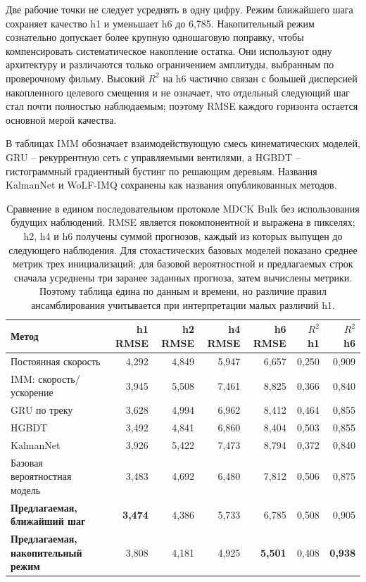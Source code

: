\documentclass[11pt,a4paper]{article}
\begin{document}
Две рабочие точки не следует усреднять в одну цифру. Режим ближайшего шага сохраняет качество h1 и уменьшает h6 до 6,785. Накопительный режим сознательно допускает более крупную одношаговую поправку, чтобы компенсировать систематическое накопление остатка. Они используют одну архитектуру и различаются только ограничением амплитуды, выбранным по проверочному фильму. Высокий $R^2$ на h6 частично связан с большей дисперсией накопленного целевого смещения и не означает, что отдельный следующий шаг стал почти полностью наблюдаемым; поэтому RMSE каждого горизонта остается основной мерой качества.

В таблицах IMM обозначает взаимодействующую смесь кинематических моделей, GRU -- рекуррентную сеть с управляемыми вентилями, а HGBDT -- гистограммный градиентный бустинг по решающим деревьям. Названия KalmanNet и WoLF-IMQ сохранены как названия опубликованных методов.


\begin{table}[tb]
\centering
\caption{Сравнение в едином последовательном протоколе MDCK Bulk без использования будущих наблюдений. RMSE является покомпонентной и выражена в пикселях; h2, h4 и h6 получены суммой прогнозов, каждый из которых выпущен до следующего наблюдения. Для стохастических базовых моделей показано среднее метрик трех инициализаций; для базовой вероятностной и предлагаемых строк сначала усреднены три заранее заданных прогноза, затем вычислены метрики. Поэтому таблица едина по данным и времени, но различие правил ансамблирования учитывается при интерпретации малых различий h1.}
\label{tab:benchmark}
\small
\setlength{\tabcolsep}{4.5pt}
\begin{tabularx}{\textwidth}{@{}Y r r r r r r@{}}
\toprule
Метод & {h1 RMSE} & {h2 RMSE} & {h4 RMSE} & {h6 RMSE} & {$R^2$ h1} & {$R^2$ h6} \\
\midrule
Постоянная скорость & 4{,}292 & 4{,}849 & 5{,}947 & 6{,}657 & 0{,}250 & 0{,}909 \\
IMM: скорость/ускорение & 3{,}945 & 5{,}508 & 7{,}461 & 8{,}825 & 0{,}366 & 0{,}840 \\
GRU по треку & 3{,}628 & 4{,}994 & 6{,}962 & 8{,}412 & 0{,}464 & 0{,}855 \\
HGBDT & 3{,}492 & 4{,}841 & 6{,}860 & 8{,}404 & 0{,}503 & 0{,}855 \\
KalmanNet & 3{,}926 & 5{,}422 & 7{,}473 & 8{,}794 & 0{,}372 & 0{,}840 \\
Базовая вероятностная модель & 3{,}483 & 4{,}692 & 6{,}480 & 7{,}812 & 0{,}506 & 0{,}875 \\
\textbf{Предлагаемая, ближайший шаг} & \textbf{3{,}474} & 4{,}386 & 5{,}733 & 6{,}785 & 0{,}508 & 0{,}905 \\
\textbf{Предлагаемая, накопительный режим} & 3{,}808 & 4{,}181 & 4{,}925 & \textbf{5{,}501} & 0{,}408 & \textbf{0{,}938} \\
\bottomrule
\end{tabularx}
\end{table}
\end{document}
